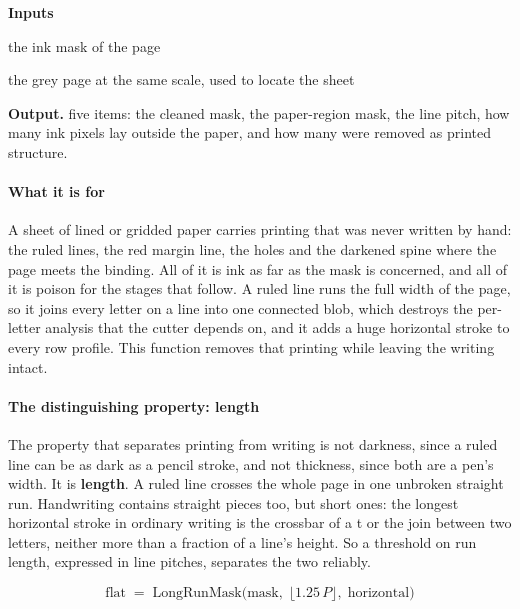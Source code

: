 \noindent\textbf{Inputs}
\begin{description}[leftmargin=2.2em,style=nextline,font=\normalfont\ttfamily]\setlength\itemsep{1pt}
  \item[{mask}] \normalfont the ink mask of the page
  \item[{g}] \normalfont the grey page at the same scale, used to locate the sheet
\end{description}

\noindent\textbf{Output.} five items: the cleaned mask, the paper-region mask, the line pitch, how many ink pixels lay outside the paper, and how many were removed as printed structure.


\paragraph{What it is for}
A sheet of lined or gridded paper carries printing that was never written by hand: the ruled lines, the red margin line, the holes and the darkened spine where the page meets the binding. All of it is ink as far as the mask is concerned, and all of it is poison for the stages that follow. A ruled line runs the full width of the page, so it joins every letter on a line into one connected blob, which destroys the per-letter analysis that the cutter depends on, and it adds a huge horizontal stroke to every row profile. This function removes that printing while leaving the writing intact.


\paragraph{The distinguishing property: length}
The property that separates printing from writing is not darkness, since a ruled line can be as dark as a pencil stroke, and not thickness, since both are a pen's width. It is \textbf{length}. A ruled line crosses the whole page in one unbroken straight run. Handwriting contains straight pieces too, but short ones: the longest horizontal stroke in ordinary writing is the crossbar of a t or the join between two letters, neither more than a fraction of a line's height. So a threshold on run length, expressed in line pitches, separates the two reliably.


\begin{equation}
\mathrm{flat} \;=\; \mathrm{LongRunMask}\big(\mathrm{mask},\; \lfloor 1.25\,P \rfloor,\;\text{horizontal}\big)
\end{equation}

